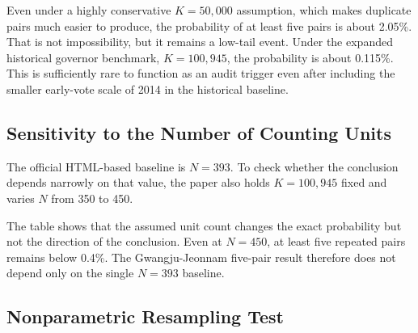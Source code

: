 \documentclass[preprint]{IEIE}
\begin{document}
Even under a highly conservative \(K=50,000\) assumption, which makes duplicate pairs much easier to produce, the probability of at least five pairs is about 2.05\%. That is not impossibility, but it remains a low-tail event. Under the expanded historical governor benchmark, \(K=100,945\), the probability is about 0.115\%. This is sufficiently rare to function as an audit trigger even after including the smaller early-vote scale of 2014 in the historical baseline.

\subsection{Sensitivity to the Number of Counting Units}

The official HTML-based baseline is \(N=393\). To check whether the conclusion depends narrowly on that value, the paper also holds \(K=100,945\) fixed and varies \(N\) from 350 to 450.

\begin{center}
\scriptsize
{}
\end{center}

The table shows that the assumed unit count changes the exact probability but not the direction of the conclusion. Even at \(N=450\), at least five repeated pairs remains below 0.4\%. The Gwangju-Jeonnam five-pair result therefore does not depend only on the single \(N=393\) baseline.

\subsection{Nonparametric Resampling Test}
\end{document}
